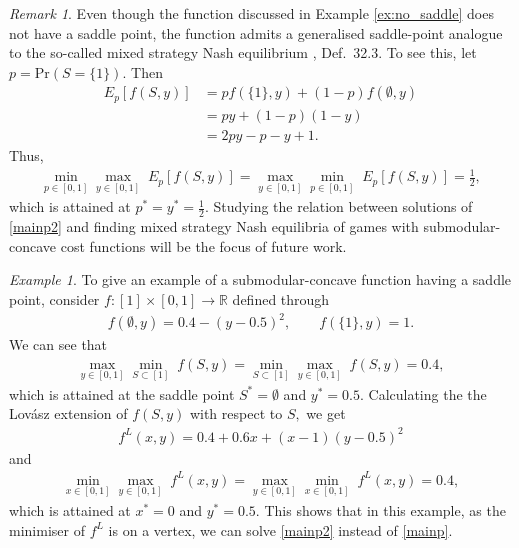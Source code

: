 \documentclass{article}
\theoremstyle{plain}
\theoremstyle{definition}
\theoremstyle{remark}
\newtheorem{remark}[theorem]{Remark}
\newtheorem{example}[theorem]{Example}
\newcommand{\R}{\mathbb{R}}
\begin{document}
\begin{remark}
Even though the function discussed in Example \ref{ex:no_saddle} does not have a saddle point, the function admits a generalised saddle-point analogue to the so-called mixed strategy Nash equilibrium \cite{osborne1994course}, Def.~32.3. To see this, let
$p=\text{Pr}(S=\{1\}).$ Then
\begin{align*}
    E_p[f(S,y)] &= pf(\{1\},y) + (1-p)f(\emptyset,y)\\
    &=py+(1-p)(1-y)\\
    &=2py-p-y+1.
\end{align*}
Thus,
\begin{align*}
     \underset{p \in [0,1]}{\min}\underset{y \in [0,1]}{\max}\;E_p[f(S,y)]=\underset{y \in [0,1]}{\max}\underset{p \in [0,1]}{\min}\;E_p[f(S,y)] = \tfrac{1}{2},
 \end{align*}
which is attained at $p^\ast=y^\ast=\frac{1}{2}.$
Studying the relation between solutions of 
\eqref{mainp2} and finding mixed strategy Nash equilibria of games with submodular-concave cost functions will be the focus of future work.
\end{remark}
\begin{example}
To give an example of a submodular-concave function having a saddle point, consider $f:[1]\times [0,1]\rightarrow \R$ defined through 
\begin{align*}
           f(\emptyset,y) =0.4-(y-0.5)^2 , \qquad        f(\{1\},y)=1.
\end{align*}
We can see that 
\begin{align}
    \underset{y \in [0,1]}{\max}\underset{S \subset [1] }{\min}\;f(S,y)=\underset{S \subset [1] }{\min}\underset{y \in [0,1]}{\max}\;f(S,y)=0.4,
\end{align}
which is attained at the saddle point $S^\ast =\emptyset$ and $y^\ast=0.5.$ Calculating the 
the Lovász extension of $f(S,y)$ with respect to $S,$ we get 
 \begin{align*}
     f^L(x,y) = 0.4+0.6x+(x-1)(y-0.5)^2
 \end{align*}
and %
  \begin{align*}
     \underset{x \in [0,1]}{\min}\underset{y \in [0,1]}{\max}\;f^L(x,y)=\underset{y \in [0,1]}{\max}\underset{x \in [0,1]}{\min}\;f^L(x,y) = 0.4,
 \end{align*}
which is attained at $x^\ast=0$ and $y^\ast=0.5$. This shows that in this example, as the minimiser of $f^L$ is on a vertex, %
we can solve \eqref{mainp2} instead of \eqref{mainp}. %
\end{example}
\end{document}
